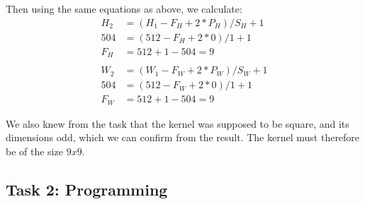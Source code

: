 Then using the same equations as above, we calculate: 
\begin{align*}
    H_2 &= (H_1 - F_H + 2 * P_H) / S_H + 1 \\
    504 &= (512 - F_H + 2 * 0) / 1 + 1 \\
    F_H &= 512 + 1 - 504 = 9 \\ \\
    W_2 &= (W_1 - F_W + 2 * P_W) / S_W + 1 \\
    504 &= (512 - F_W + 2 * 0) / 1 + 1 \\
    F_W &= 512 + 1 - 504 = 9
\end{align*}

We also knew from the task that the kernel was supposed to be square, and its dimensions odd, which we can confirm from the result. The kernel must therefore be of the size $9 x 9$. 

\newpage
\subsection{Task 2: Programming}
